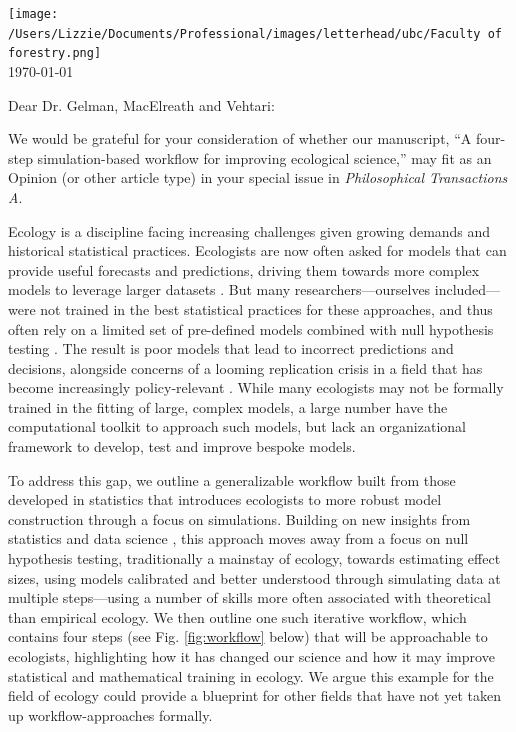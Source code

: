 \documentclass[11pt]{article}
\begin{document}

\renewcommand{\refname}{\CHead{}}

\hspace{-5ex} \texttt{[image: /Users/Lizzie/Documents/Professional/images/letterhead/ubc/Faculty of forestry.png]}
\vspace{1.5ex}\\

\setlength{\parindent}{0pt}
\setlength{\parskip}{7pt}
\today

Dear Dr. Gelman, MacElreath and Vehtari:

We would be grateful for your consideration of whether our manuscript, ``A four-step simulation-based workflow for improving ecological science,'' may fit as an Opinion (or other article type) in your special issue in \emph{Philosophical Transactions A}.

Ecology is a discipline facing increasing challenges given growing demands and historical statistical practices. Ecologists are now often asked for models that can provide useful forecasts and predictions, driving them towards more complex models to leverage larger datasets \citep{anderson2021trends,muff2022rewriting}. But many researchers---ourselves included---were not trained in the best statistical practices for these approaches, and thus often rely on a limited set of pre-defined models combined with null hypothesis testing \citep{quinn1983hypothesis,hobbs2006alternatives}. The result is poor models that lead to incorrect predictions and decisions, alongside concerns of a looming replication crisis \citep{filazzola2021replication,fraser2020role} in a field that has become increasingly policy-relevant \citep{hak2016sustainable,lindenmayer2010science}.  While many ecologists may not be formally trained in the fitting of large, complex models, a large number have the computational toolkit to approach such models, but lack an organizational framework to develop, test and improve bespoke models. 

To address this gap, we outline a generalizable workflow built from those developed in statistics  \citep{gelman2020bayesian,grinsztajn2021,vandeschoot2021} that introduces ecologists to more robust model construction through a focus on simulations. Building on new insights from statistics and data science \citep{gelman2020bayesian}, this approach moves away from a focus on null hypothesis testing, traditionally a mainstay of ecology, towards estimating effect sizes, using models calibrated and better understood through simulating data at multiple steps---using a number of skills more often associated with theoretical than empirical ecology. We then outline one such iterative workflow, which contains four steps (see Fig. \ref{fig:workflow} below) that will be approachable to ecologists,  highlighting how it has changed our science and how it may improve statistical and mathematical training in ecology. We argue this example for the field of ecology could provide a blueprint for other fields that have not yet taken up workflow-approaches formally. 
\end{document}
